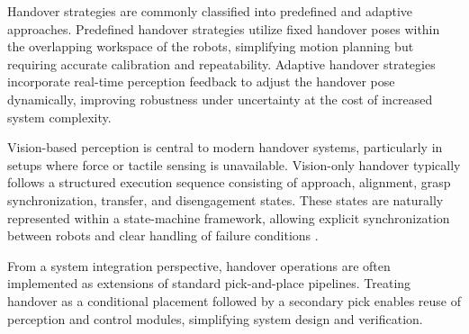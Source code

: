 Handover strategies are commonly classified into predefined and adaptive approaches. Predefined handover strategies utilize fixed handover poses within the overlapping workspace of the robots, simplifying motion planning but requiring accurate calibration and repeatability. Adaptive handover strategies incorporate real-time perception feedback to adjust the handover pose dynamically, improving robustness under uncertainty at the cost of increased system complexity.

Vision-based perception is central to modern handover systems, particularly in setups where force or tactile sensing is unavailable. Vision-only handover typically follows a structured execution sequence consisting of approach, alignment, grasp synchronization, transfer, and disengagement states. These states are naturally represented within a state-machine framework, allowing explicit synchronization between robots and clear handling of failure conditions \cite{siciliano2016handbook}.

From a system integration perspective, handover operations are often implemented as extensions of standard pick-and-place pipelines. Treating handover as a conditional placement followed by a secondary pick enables reuse of perception and control modules, simplifying system design and verification.
